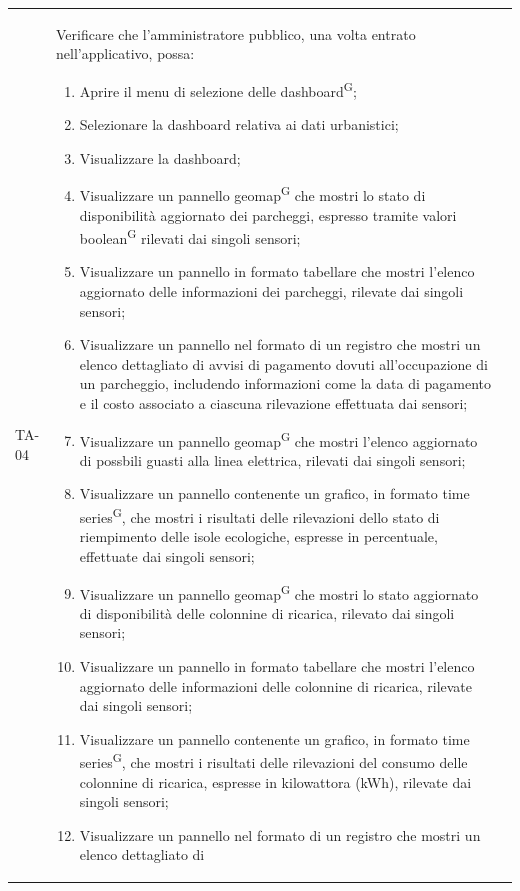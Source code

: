 \documentclass[8pt]{article}
\newcommand{\glossterm}[1]{#1\textsuperscript{G}} %
\begin{document}
\begin{longtable}{|>{\centering}p{2cm}|>{\RaggedRight}m{12cm}|>{\centering\arraybackslash}p{2cm}|}
    \hline
    TA-04 & Verificare che l'amministratore pubblico, una volta entrato nell'applicativo, possa:
    \begin{enumerate}
        \setlength\itemsep{0em}
        \item Aprire il menu di selezione delle \glossterm{dashboard};
        \item Selezionare la dashboard relativa ai dati urbanistici;
        \item Visualizzare la dashboard;
        \item Visualizzare un pannello \glossterm{geomap} che mostri lo stato di disponibilità aggiornato dei
            parcheggi, espresso tramite valori \glossterm{boolean} rilevati dai singoli sensori;
        \item Visualizzare un pannello in formato tabellare che mostri l'elenco aggiornato delle informazioni dei
            parcheggi, rilevate dai singoli sensori;
        \item Visualizzare un pannello nel formato di un registro che mostri un elenco dettagliato di
            avvisi di pagamento dovuti all'occupazione di un parcheggio, includendo informazioni come la data di pagamento e il costo
            associato a ciascuna rilevazione effettuata dai sensori;
        \item Visualizzare un pannello \glossterm{geomap} che mostri l'elenco aggiornato di possbili guasti alla linea elettrica, rilevati dai singoli sensori;
        \item Visualizzare un pannello contenente un grafico, in formato \glossterm{time series}, che mostri i
            risultati delle rilevazioni dello stato di riempimento delle isole ecologiche, espresse in percentuale, effettuate dai singoli sensori;
        \item Visualizzare un pannello \glossterm{geomap} che mostri lo stato aggiornato di disponibilità delle colonnine di ricarica,
            rilevato dai singoli sensori;
        \item Visualizzare un pannello in formato tabellare che mostri l'elenco aggiornato delle informazioni delle colonnine di ricarica,
            rilevate dai singoli sensori;
        \item Visualizzare un pannello contenente un grafico, in formato \glossterm{time series}, che mostri i
            risultati delle rilevazioni del consumo delle colonnine di ricarica, espresse in kilowattora (kWh), rilevate dai singoli sensori;
        \item Visualizzare un pannello nel formato di un registro che mostri un elenco dettagliato di

\end{enumerate}
\end{longtable}
\end{document}
